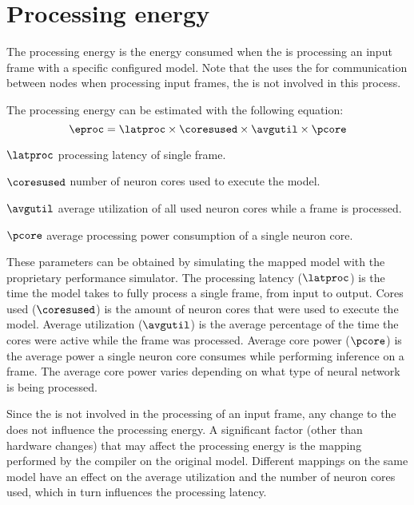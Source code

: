 \section{Processing energy}
The processing energy is the energy consumed when the \graicore{} is processing an input frame with a specific configured model.
Note that the \graicore{} uses the \eventnoc{} for communication between nodes when processing input frames, the \confignoc{} is not involved in this process.

The processing energy can be estimated with the following equation:
\begin{equation}
    \eproc = \latproc \times \coresused \times \avgutil \times \pcore
\end{equation}
\eqexplSetItemWidth{6em}
\begin{eqexpl}
    \item{$\latproc$} processing latency of single frame.
    \item{$\coresused$} number of neuron cores used to execute the model.
    \item{$\avgutil$} average utilization of all used neuron cores while a frame is processed.
    \item{$\pcore$} average processing power consumption of a single neuron core.
\end{eqexpl}

These parameters can be obtained by simulating the mapped model with the proprietary performance simulator.
The processing latency ($\latproc$) is the time the model takes to fully process a single frame, from input to output.
Cores used ($\coresused$) is the amount of neuron cores that were used to execute the model.
Average utilization ($\avgutil$) is the average percentage of the time the cores were active while the frame was processed. 
Average core power ($\pcore$) is the average power a single neuron core consumes while performing inference on a frame.
The average core power varies depending on what type of neural network is being processed.

Since the \confignoc{} is not involved in the processing of an input frame, any change to the \confignoc{} does not influence the processing energy.
A significant factor (other than hardware changes) that may affect the processing energy is the mapping performed by the compiler on the original model. 
Different mappings on the same model have an effect on the average utilization and the number of neuron cores used, which in turn influences the processing latency.

